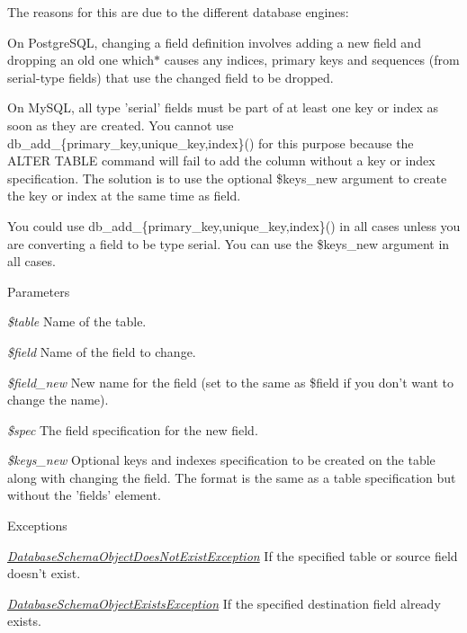 The reasons for this are due to the different database engines:

On PostgreSQL, changing a field definition involves adding a new field and dropping an old one which$\ast$ causes any indices, primary keys and sequences (from serial-\/type fields) that use the changed field to be dropped.

On MySQL, all type 'serial' fields must be part of at least one key or index as soon as they are created. You cannot use db\_\-add\_\-\{primary\_\-key,unique\_\-key,index\}() for this purpose because the ALTER TABLE command will fail to add the column without a key or index specification. The solution is to use the optional \$keys\_\-new argument to create the key or index at the same time as field.

You could use db\_\-add\_\-\{primary\_\-key,unique\_\-key,index\}() in all cases unless you are converting a field to be type serial. You can use the \$keys\_\-new argument in all cases.


\begin{DoxyParams}{Parameters}
\item[{\em \$table}]Name of the table. \item[{\em \$field}]Name of the field to change. \item[{\em \$field\_\-new}]New name for the field (set to the same as \$field if you don't want to change the name). \item[{\em \$spec}]The field specification for the new field. \item[{\em \$keys\_\-new}]Optional keys and indexes specification to be created on the table along with changing the field. The format is the same as a table specification but without the 'fields' element.\end{DoxyParams}

\begin{DoxyExceptions}{Exceptions}
\item[{\em \hyperlink{classDatabaseSchemaObjectDoesNotExistException}{DatabaseSchemaObjectDoesNotExistException}}]If the specified table or source field doesn't exist. \item[{\em \hyperlink{classDatabaseSchemaObjectExistsException}{DatabaseSchemaObjectExistsException}}]If the specified destination field already exists. \end{DoxyExceptions}


